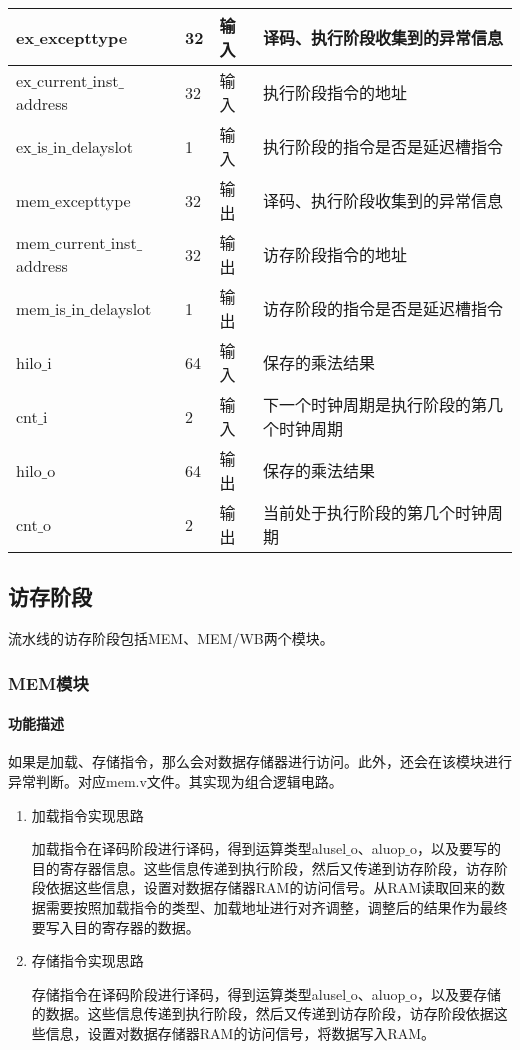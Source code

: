 \begin{table}[H]
	\centering
	\begin{tabular}{|l|l|l|l|}
		\hline
		ex$\_$excepttype & 32 & 输入 & 译码、执行阶段收集到的异常信息 \\
		\hline
		ex$\_$current$\_$inst$\_$address & 32 & 输入 & 执行阶段指令的地址 \\
		\hline
		ex$\_$is$\_$in$\_$delayslot & 1 & 输入 & 执行阶段的指令是否是延迟槽指令 \\
		\hline
		mem$\_$excepttype & 32 & 输出 & 译码、执行阶段收集到的异常信息 \\
		\hline
		mem$\_$current$\_$inst$\_$address & 32 & 输出 & 访存阶段指令的地址 \\
		\hline
		mem$\_$is$\_$in$\_$delayslot & 1 & 输出 & 访存阶段的指令是否是延迟槽指令 \\
		\hline
		hilo$\_$i & 64 & 输入 & 保存的乘法结果 \\
		\hline
		cnt$\_$i & 2 & 输入 & 下一个时钟周期是执行阶段的第几个时钟周期 \\
		\hline
		hilo$\_$o & 64 & 输出 & 保存的乘法结果 \\
		\hline
		cnt$\_$o & 2 & 输出 & 当前处于执行阶段的第几个时钟周期 \\
		\hline
	\end{tabular}
\end{table}
\subsection{访存阶段}
流水线的访存阶段包括MEM、MEM/WB两个模块。
\subsubsection{MEM模块}
\paragraph{功能描述}
\quad

\quad

如果是加载、存储指令，那么会对数据存储器进行访问。此外，还会在该模块进行异常判断。对应mem.v文件。其实现为组合逻辑电路。

\begin{enumerate}
	\item 加载指令实现思路
	
	加载指令在译码阶段进行译码，得到运算类型alusel$\_$o、aluop$\_$o，以及要写的目的寄存器信息。这些信息传递到执行阶段，然后又传递到访存阶段，访存阶段依据这些信息，设置对数据存储器RAM的访问信号。从RAM读取回来的数据需要按照加载指令的类型、加载地址进行对齐调整，调整后的结果作为最终要写入目的寄存器的数据。
	
	\item 存储指令实现思路
	
	存储指令在译码阶段进行译码，得到运算类型alusel$\_$o、aluop$\_$o，以及要存储的数据。这些信息传递到执行阶段，然后又传递到访存阶段，访存阶段依据这些信息，设置对数据存储器RAM的访问信号，将数据写入RAM。
\end{enumerate}

